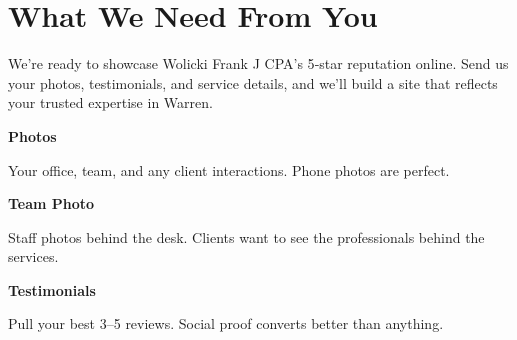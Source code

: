 \documentclass[11pt,letterpaper]{article}
\begin{document}
\vspace{0.2em}

\section*{What We Need From You}

We’re ready to showcase Wolicki Frank J CPA’s 5‑star reputation online. Send us your photos, testimonials, and service details, and we’ll build a site that reflects your trusted expertise in Warren.

\vspace{0.12em}

\noindent\begin{minipage}[t]{0.48\textwidth}
\begin{tcolorbox}[colframe=accent-teal, boxrule=1pt, left=0.7em, right=0.7em, top=0.5em, bottom=0.5em, arc=4pt, boxsep=0pt]
{\bfseries\small\color{accent-teal}Photos}

\vspace{0.15em}

{\small Your office, team, and any client interactions. Phone photos are perfect.}
\end{tcolorbox}

\vspace{0.1em}

\begin{tcolorbox}[colframe=accent-teal, boxrule=1pt, left=0.7em, right=0.7em, top=0.5em, bottom=0.5em, arc=4pt, boxsep=0pt]
{\bfseries\small\color{accent-teal}Team Photo}

\vspace{0.15em}

{\small Staff photos behind the desk. Clients want to see the professionals behind the services.}
\end{tcolorbox}

\vspace{0.1em}

\begin{tcolorbox}[colframe=accent-teal, boxrule=1pt, left=0.7em, right=0.7em, top=0.5em, bottom=0.5em, arc=4pt, boxsep=0pt]
{\bfseries\small\color{accent-teal}Testimonials}

\vspace{0.15em}

{\small Pull your best 3--5 reviews. Social proof converts better than anything.}
\end{tcolorbox}
\end{minipage}
\hfill
\end{document}
